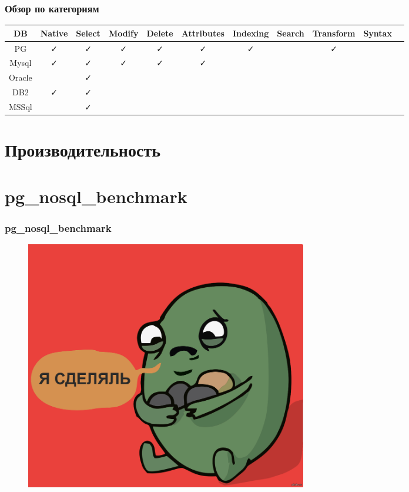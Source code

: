 \documentclass[14pt, compress, aspectratio=169]{beamer}
\def\check{\textcolor{check}{\FA \faCheck}}
\def\fail{\textcolor{fail}{\FA \faRemove}}
\def\question{\textcolor{question}{\FA \faSearch}}
\begin{document}
\begin{frame}[fragile]
    \frametitle{Обзор по категориям}

    \begin{adjustbox}{max totalsize={1.1\textwidth}{2.0\textheight},center}
        \begin{tabular}{c | c | c | c | c | c | c | c | c | c | c}
            DB & Native & Select & Modify & Delete & Attributes & Indexing & Search & Transform & Syntax \\
            \hline
            PG & \check & \check & \check & \check & \check & \check & \question & \check & \question \\
            Mysql & \check & \check & \check & \check & \check & \question & \question & \fail & \fail \\
            Oracle & \fail & \check & \fail & \fail & \fail & \fail & \question & \question & \question \\
            DB2 & \check & \check & \fail & \fail & \fail & \fail & \fail & \question & \fail \\
            MSSql & \fail & \check & \fail & \fail & \fail & \fail & \question & \question & \fail \\
        \end{tabular}
    \end{adjustbox}
\end{frame}

\section{Производительность}

\section{pg\_nosql\_benchmark}

\begin{frame}[fragile]
    \frametitle{pg\_nosql\_benchmark}
    \vspace{-35pt}
    \begin{figure}
        \includegraphics[width=0.6\textwidth,center]{i_made.jpg}
    \end{figure}
\end{frame}
\end{document}
